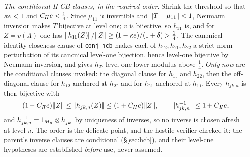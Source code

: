 \emph{The conditional H-CB clauses, in the required order.} Shrink the threshold so that
$\kappa e<1$ and $C_He<\tfrac14$. Since $\mu_{11}$ is invertible and
$\lVert T-\mu_{11}\rVert<1$, Neumann inversion makes $T$ bijective at level one; $v$ is bijective,
so $h_{11}$ is, and for $Z=v(A)$ one has
$\lVert h_{11}(Z)\rVert/\lVert Z\rVert\ge(1-\kappa e)/(1+\delta)>\tfrac14$. The canonical-identity
closeness clause of \texttt{conj-hcb} makes each of $h_{12},h_{21},h_{22}$ a strict-norm
perturbation of its canonical level-one bijection, hence level-one bijective by Neumann
inversion, and gives $h_{22}$ level-one lower modulus above $\tfrac14$. \emph{Only now} are
the conditional clauses invoked: the diagonal clause for $h_{11}$ and $h_{22}$, then the
off-diagonal clause for $h_{12}$ anchored at $h_{22}$ and for $h_{21}$ anchored at
$h_{11}$. Every $h_{jk,n}$ is then bijective with
\begin{equation}\label{eq:extcb-hinv}
  (1-C_He)\lVert Z\rVert\le\lVert h_{jk,n}(Z)\rVert\le(1+C_He)\lVert Z\rVert,
  \qquad \lVert h_{jk,n}^{-1}\rVert\le1+C_He ,
\end{equation}
and $h_{jk,n}^{-1}=1_{M_{n}}\otimes h_{jk}^{-1}$ by uniqueness of inverses, so no inverse is chosen
afresh at level $n$. The order is the delicate point, and the hostile verifier checked it:
the parent's inverse clauses are conditional (\S\ref{sec:hcb}), and their level-one
hypotheses are established \emph{before} use, never assumed.

